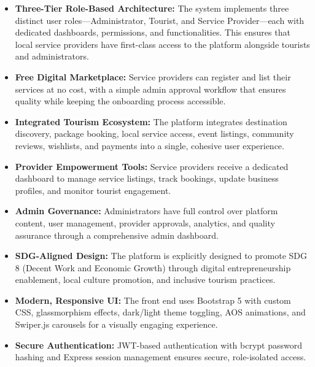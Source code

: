 \begin{itemize}[leftmargin=2em]
    \item \textbf{Three-Tier Role-Based Architecture:} The system implements three distinct user roles---Administrator, Tourist, and Service Provider---each with dedicated dashboards, permissions, and functionalities. This ensures that local service providers have first-class access to the platform alongside tourists and administrators.

    \item \textbf{Free Digital Marketplace:} Service providers can register and list their services at no cost, with a simple admin approval workflow that ensures quality while keeping the onboarding process accessible.

    \item \textbf{Integrated Tourism Ecosystem:} The platform integrates destination discovery, package booking, local service access, event listings, community reviews, wishlists, and payments into a single, cohesive user experience.

    \item \textbf{Provider Empowerment Tools:} Service providers receive a dedicated dashboard to manage service listings, track bookings, update business profiles, and monitor tourist engagement.

    \item \textbf{Admin Governance:} Administrators have full control over platform content, user management, provider approvals, analytics, and quality assurance through a comprehensive admin dashboard.

    \item \textbf{SDG-Aligned Design:} The platform is explicitly designed to promote SDG 8 (Decent Work and Economic Growth) through digital entrepreneurship enablement, local culture promotion, and inclusive tourism practices.

    \item \textbf{Modern, Responsive UI:} The front end uses Bootstrap 5 with custom CSS, glassmorphism effects, dark/light theme toggling, AOS animations, and Swiper.js carousels for a visually engaging experience.

    \item \textbf{Secure Authentication:} JWT-based authentication with bcrypt password hashing and Express session management ensures secure, role-isolated access.
\end{itemize}

